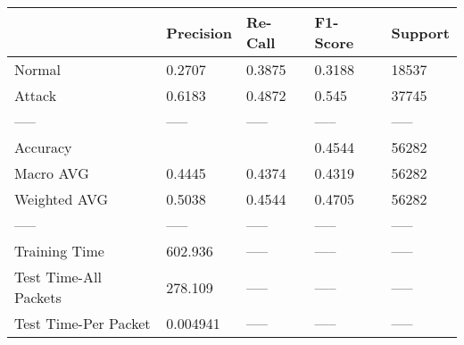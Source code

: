 \begin{tabular}{lllll}
\toprule
{} & Precision & Re-Call & F1-Score & Support \\
\midrule
Normal                &    0.2707 &  0.3875 &   0.3188 &   18537 \\
Attack                &    0.6183 &  0.4872 &    0.545 &   37745 \\
-----                 &     ----- &   ----- &    ----- &   ----- \\
Accuracy              &           &         &   0.4544 &   56282 \\
Macro AVG             &    0.4445 &  0.4374 &   0.4319 &   56282 \\
Weighted AVG          &    0.5038 &  0.4544 &   0.4705 &   56282 \\
-----                 &     ----- &   ----- &    ----- &   ----- \\
Training Time         &   602.936 &   ----- &    ----- &   ----- \\
Test Time-All Packets &   278.109 &   ----- &    ----- &   ----- \\
Test Time-Per Packet  &  0.004941 &   ----- &    ----- &   ----- \\
\bottomrule
\end{tabular}
